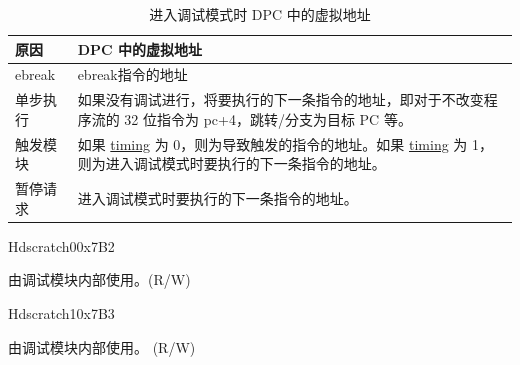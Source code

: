 \begin{longtable}{| l| p{12cm}|}
\caption{进入调试模式时 DPC 中的虚拟地址} \label{tab:riscvcpu-dbg-cause}
\\ \hline
\rowcolor{lightgray}
\textbf{原因} & \textbf{DPC 中的虚拟地址}   \\ \hline
ebreak \label{ebreak} &  ebreak指令的地址  \\ \hline
单步执行 \label{sstep} & 如果没有调试进行，将要执行的下一条指令的地址，即对于不改变程序流的 32 位指令为 pc+4，跳转/分支为目标 PC 等。  \\ \hline
触发模块 \label{trigger} &  如果 \hyperref[fielddesc:MCONTROLTIMING]{timing} 为 0，则为导致触发的指令的地址。如果 \hyperref[fielddesc:MCONTROLTIMING]{timing} 为 1，则为进入调试模式时要执行的下一条指令的地址。\\ \hline
暂停请求\label{halt} & 进入调试模式时要执行的下一条指令的地址。   \\ \hline
\end{longtable}

\begin{register}{H}{dscratch0}{0x7B2}
\label{regdesc:DSCRATCH0}
%
\regnewline%
\begin{regdesc}
\begin{reglist}
\label{fielddesc:DSCRATCH0}\item [dscratch0] 由调试模块内部使用。(R/W)
\end{reglist}
\end{regdesc}
\end{register}

\begin{register}{H}{dscratch1}{0x7B3}
\label{regdesc:DSCRATCH1}
%
\regnewline%
\begin{regdesc}
\begin{reglist}
\label{fielddesc:DSCRATCH1}\item [dscratch1] 由调试模块内部使用。 (R/W)
\end{reglist}
\end{regdesc}
\end{register}